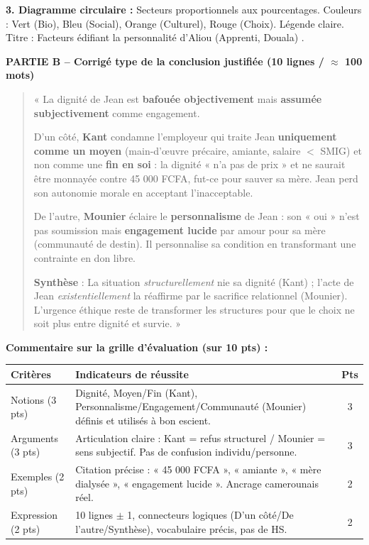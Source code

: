 \documentclass[11pt]{article}
\begin{document}
\begin{exoresolu}
\textbf{3. Diagramme circulaire :} Secteurs proportionnels aux pourcentages. Couleurs : Vert (Bio), Bleu (Social), Orange (Culturel), Rouge (Choix). Légende claire. Titre : \og{} Facteurs édifiant la personnalité d'Aliou (Apprenti, Douala) \fg{}.

\vspace{0.5cm}
\textbf{PARTIE B -- Corrigé type de la conclusion justifiée (10 lignes / $\approx$ 100 mots)}

\begin{quote}
« La dignité de Jean est \textbf{bafouée objectivement} mais \textbf{assumée subjectivement} comme engagement. 

D'un côté, \textbf{Kant} condamne l'employeur qui traite Jean \textbf{uniquement comme un moyen} (main-d'œuvre précaire, amiante, salaire $<$ SMIG) et non comme une \textbf{fin en soi} : la dignité « n'a pas de prix » et ne saurait être monnayée contre 45 000 FCFA, fut-ce pour sauver sa mère. Jean perd son autonomie morale en acceptant l'inacceptable.

De l'autre, \textbf{Mounier} éclaire le \textbf{personnalisme} de Jean : son « oui » n'est pas soumission mais \textbf{engagement lucide} par amour pour sa mère (communauté de destin). Il personnalise sa condition en transformant une contrainte en don libre. 

\textbf{Synthèse} : La situation \textit{structurellement} nie sa dignité (Kant) ; l'acte de Jean \textit{existentiellement} la réaffirme par le sacrifice relationnel (Mounier). L'urgence éthique reste de transformer les structures pour que le choix ne soit plus entre dignité et survie. »
\end{quote}

\textbf{Commentaire sur la grille d'évaluation (sur 10 pts) :}
\begin{center}
\begin{tabularx}{\linewidth}{|l|X|c|}\hline
\textbf{Critères} & \textbf{Indicateurs de réussite} & \textbf{Pts} \\ \hline
Notions (3 pts) & Dignité, Moyen/Fin (Kant), Personnalisme/Engagement/Communauté (Mounier) définis et utilisés à bon escient. & 3 \\ \hline
Arguments (3 pts) & Articulation claire : Kant = refus structurel / Mounier = sens subjectif. Pas de confusion individu/personne. & 3 \\ \hline
Exemples (2 pts) & Citation précise : « 45 000 FCFA », « amiante », « mère dialysée », « engagement lucide ». Ancrage camerounais réel. & 2 \\ \hline
Expression (2 pts) & 10 lignes $\pm$ 1, connecteurs logiques (D'un côté/De l'autre/Synthèse), vocabulaire précis, pas de HS. & 2 \\ \hline
\end{tabularx}
\end{center}
\end{exoresolu}
\end{document}
